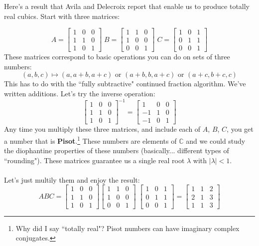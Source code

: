 \documentclass[12pt]{article}
\begin{document}
\noindent Here's a result that Avila and Delecroix report that enable us to produce totally real cubics.  Start with three matrices:

$$ 
A = \left[
\begin{array}{ccc} 
1 & 0 & 0 \\
1 & 1 & 0 \\
1 & 0 & 1
\end{array} \right] \;
B = \left[
\begin{array}{ccc} 
1 & 1 & 0 \\
1 & 0 & 0 \\
0 & 0 & 1
\end{array} \right] \;
C = \left[
\begin{array}{ccc} 
1 & 0 & 1 \\
0 & 1 & 1 \\
0 & 0 & 1
\end{array} \right] $$
These matrices correspond to basic operations you can do on sets of three numbers:
$$ (a,b,c) \mapsto (a,a+b,a+c) \text{ or }  (a+b,b,a+c) \text{ or }  (a+c,b+c,c)$$
This has to do with the ``fully subtractive" continued fraction algorithm.  We've written additions.  Let's try the inverse operation:
$$ 
\left[
\begin{array}{ccc} 
1 & 0 & 0 \\
1 & 1 & 0 \\
1 & 0 & 1
\end{array} \right]^{-1}
= \left[
\begin{array}{rcc} 
1 & 0 & 0 \\
-1 & 1 & 0 \\
-1 & 0 & 1
\end{array} \right] $$
Any time you multiply these three matrices, and include each of $A$, $B$, $C$, you get a number that is \textbf{Pisot}.\footnote{Why did I say ``totally real"?  Pisot numbers can have imaginary complex conjugates.}  These numbers are elements of $\mathbb{C}$ and we could study the diophantine properties of these numbers (basically... different types of ``rounding").  These matrices guarantee us a single real root $\lambda$ with $|\lambda | < 1$.  \\ \\
Let's just multily them and enjoy the result:
$$ 
ABC = \left[
\begin{array}{ccc} 
1 & 0 & 0 \\
1 & 1 & 0 \\
1 & 0 & 1
\end{array} \right] \left[
\begin{array}{ccc} 
1 & 1 & 0 \\
1 & 0 & 0 \\
0 & 0 & 1
\end{array} \right] \;\left[
\begin{array}{ccc} 
1 & 0 & 1 \\
0 & 1 & 1 \\
0 & 0 & 1
\end{array} \right]
= 
\left[
\begin{array}{ccc} 
1 & 1 & 2 \\
2 & 1 & 3 \\
1 & 1 & 3
\end{array} \right] $$
\end{document}
